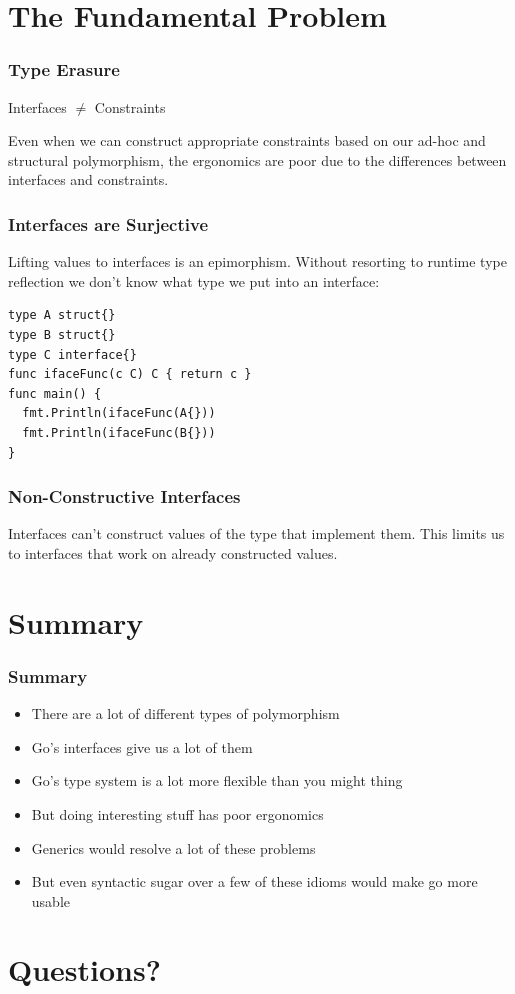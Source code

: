 \documentclass{beamer}
\newcommand{\hugecenter}[1]{\begin{center}\begin{huge}#1\end{huge}\end{center}}
\begin{document}
\section{The Fundamental Problem}

\begin{frame}
  \frametitle{Type Erasure}
  \hugecenter{Interfaces $\neq$ Constraints}

  Even when we can construct appropriate constraints based on
  our ad-hoc and structural polymorphism, the ergonomics are poor due
  to the differences between interfaces and constraints.
\end{frame}

\begin{frame}[fragile]
  \frametitle{Interfaces are Surjective}
  Lifting values to interfaces is an epimorphism.  Without resorting
  to runtime type reflection we don't know what type we put into an
  interface:
\begin{lstlisting}[language=Golang]
type A struct{}
type B struct{}
type C interface{}
func ifaceFunc(c C) C { return c }
func main() {
  fmt.Println(ifaceFunc(A{}))
  fmt.Println(ifaceFunc(B{}))
}
\end{lstlisting}
\end{frame}

\begin{frame}
  \frametitle{Non-Constructive Interfaces}
  Interfaces can't construct values of the type that implement
  them. This limits us to interfaces that work on already constructed
  values.
\end{frame}

\section{Summary}
\begin{frame}
  \frametitle{Summary}
  \begin{itemize}
  \item There are a lot of different types of polymorphism
  \item Go's interfaces give us a lot of them
  \item Go's type system is a lot more flexible than you might thing
  \item But doing interesting stuff has poor ergonomics
  \item Generics would resolve a lot of these problems
  \item But even syntactic sugar over a few of these idioms would make go more usable
  \end{itemize}
\end{frame}

\section{Questions?}
\end{document}
